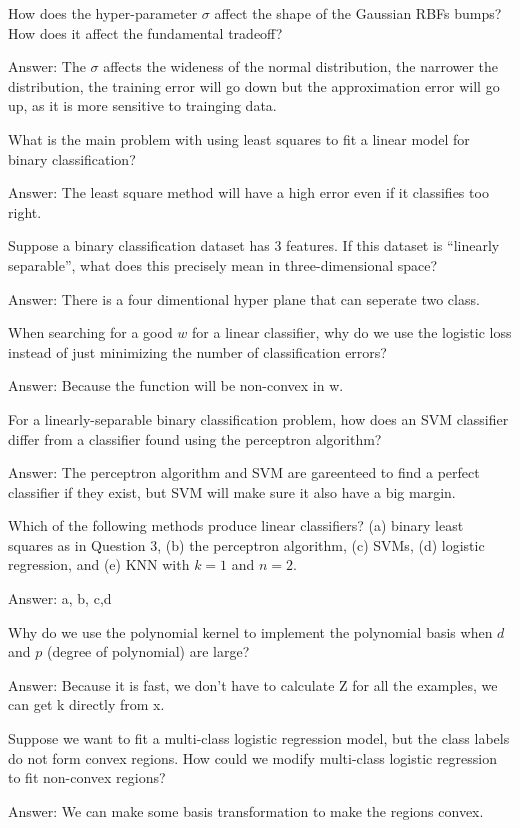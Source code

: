\documentclass{article}
\def\ans#1{\par\gre{Answer: #1}}
\def\gre#1{{\color{gre}#1}}
\begin{document}
{\item How does the hyper-parameter $\sigma$ affect the shape of the Gaussian RBFs bumps? How does it affect the fundamental tradeoff? \ans{The $\sigma$ affects the wideness of the normal distribution, the narrower the distribution, the training error will go down but the approximation error will go up, as it is more sensitive to trainging data.}
\item What is the main problem with using least squares to fit a linear model for binary classification? \ans{The least square method will have a high error even if it classifies too right.}
\item Suppose a binary classification dataset has 3 features. If this dataset is ``linearly separable'', what does this precisely mean in three-dimensional space? \ans{There is a four dimentional hyper plane that can seperate two class.}
\item When searching for a good $w$ for a linear classifier, why do we use the logistic loss instead of just minimizing the number of classification errors? \ans{Because the function will be non-convex in w.}
\item For a linearly-separable binary classification problem, how does an SVM classifier differ from a classifier found using the perceptron algorithm? \ans{The perceptron algorithm and SVM are gareenteed to find a perfect classifier if they exist, but SVM will make sure it also have a big margin.}
\item Which of the following methods produce linear classifiers? (a) binary least squares as in Question 3, (b) the perceptron algorithm, (c) SVMs, (d) logistic regression, and (e) KNN with $k=1$ and $n=2$. \ans{a, b, c,d}
\item Why do we use the polynomial kernel to implement the polynomial basis when $d$ and $p$ (degree of polynomial) are large? \ans{Because it is fast, we don't have to calculate Z for all the examples, we can get k directly from x.}
\item Suppose we want to fit a multi-class logistic regression model, but the class labels do not form convex regions. How could we modify multi-class logistic regression to fit non-convex regions? \ans{We can make some basis transformation to make the regions convex.}
}
\end{document}
